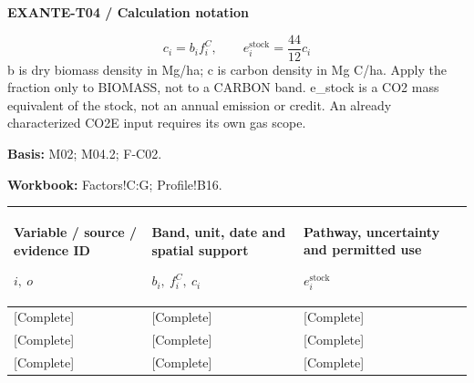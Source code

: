 \par\begingroup\sffamily\fontsize{8}{10}\selectfont\color{NEBGreen}\setlength{\parskip}{2pt}\setlength{\abovedisplayskip}{4pt}\setlength{\belowdisplayskip}{4pt}\setlength{\abovedisplayshortskip}{2pt}\setlength{\belowdisplayshortskip}{3pt}
\textbf{EXANTE-T04 / Calculation notation}\par
{\fontsize{9}{11}\selectfont\[ c_i=b_i f_i^C,\qquad e_i^{\mathrm{stock}}=\frac{44}{12}c_i \]}
b is dry biomass density in Mg/ha; c is carbon density in Mg C/ha. Apply the fraction only to BIOMASS, not to a CARBON band. e\_stock is a CO2 mass equivalent of the stock, not an annual emission or credit. An already characterized CO2E input requires its own gas scope.\par
\textbf{Basis:} M02; M04.2; F-C02.\par
\textbf{Workbook:} Factors!C:G; Profile!B16.\par\endgroup
{\sffamily\fontsize{8.3}{10.3}\selectfont\begin{longtable}{@{}P{54.83mm} P{54.83mm} P{54.83mm}@{}}
\toprule
\textbf{Variable / source / evidence ID}\par {\normalfont\fontsize{8.2}{10}\selectfont $i,\ o$} & \textbf{Band, unit, date and spatial support}\par {\normalfont\fontsize{8.2}{10}\selectfont $b_i,\ f_i^C,\ c_i$} & \textbf{Pathway, uncertainty and permitted use}\par {\normalfont\fontsize{8.2}{10}\selectfont $e_i^{\mathrm{stock}}$}\\\midrule\endhead
\rule{0pt}{8mm}[Complete] & [Complete] & [Complete]\\\hline
\rule{0pt}{8mm}[Complete] & [Complete] & [Complete]\\\hline
\rule{0pt}{8mm}[Complete] & [Complete] & [Complete]\\\hline
\end{longtable}}
